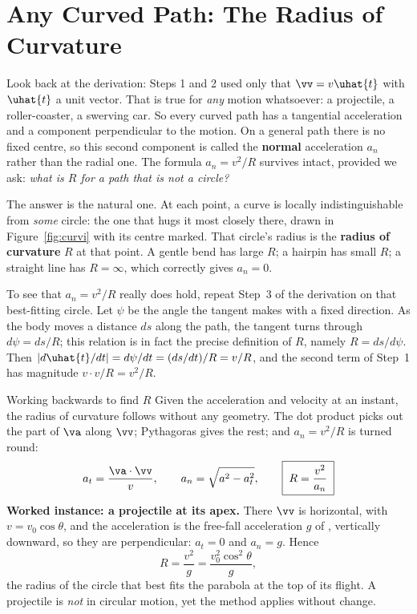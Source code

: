 \section{Any Curved Path: The Radius of Curvature}\label{sec:curvature}

Look back at the derivation: Steps 1 and 2 used only that $\vv=v\uhat{t}$ with $\uhat{t}$ a unit vector.
That is true for \emph{any} motion whatsoever: a projectile, a roller-coaster, a swerving car. So
every curved path has a tangential acceleration and a component perpendicular to the motion. On a
general path there is no fixed centre, so this second component is called the \textbf{normal}
acceleration $a_n$ rather than the radial one. The formula $a_n=v^{2}/R$ survives intact, provided we
ask: \emph{what is $R$ for a path that is not a circle?}

The answer is the natural one. At each point, a curve is locally indistinguishable from \emph{some}
circle: the one that hugs it most closely there, drawn in Figure~\ref{fig:curvi} with its centre marked. That circle's radius is the \textbf{radius of
curvature} $R$ at that point. A gentle bend has large $R$; a hairpin has small $R$; a straight line has
$R=\infty$, which correctly gives $a_n=0$.

To see that $a_n=v^{2}/R$ really does hold, repeat Step~3 of the derivation on that best-fitting circle.
Let $\psi$ be the angle the tangent makes with a fixed direction. As the body moves a distance $ds$ along
the path, the tangent turns through $d\psi=ds/R$; this relation is in fact the precise definition of
$R$, namely $R=ds/d\psi$. Then $|d\uhat{t}/dt|=d\psi/dt=(ds/dt)/R=v/R$, and the second term of Step~1 has
magnitude $v\cdot v/R=v^{2}/R$.


\begin{figure}[htbp]
\centering
{}
\end{figure}

\begin{methodbox}{Working backwards to find $R$}
Given the acceleration and velocity at an instant, the radius of curvature follows without any geometry.
The dot product picks out the part of $\va$ along $\vv$; Pythagoras gives the rest; and $a_n=v^2/R$
is turned round:
\[
a_t=\frac{\va\cdot\vv}{v},\qquad
a_n=\sqrt{a^{2}-a_t^{2}},\qquad
\boxed{\;R=\frac{v^{2}}{a_n}\;}
\]
\textbf{Worked instance: a projectile at its apex.} There $\vv$ is horizontal, with $v=v_0\cos\theta$, and
the acceleration is the free-fall acceleration $g$ of , vertically downward, so they are perpendicular: $a_t=0$ and $a_n=g$. Hence
\[
R=\frac{v^{2}}{g}=\frac{v_0^{2}\cos^{2}\theta}{g},
\]
the radius of the circle that best fits the parabola at the top of its flight. A projectile is
\emph{not} in circular motion, yet the method applies without change.
\end{methodbox}

